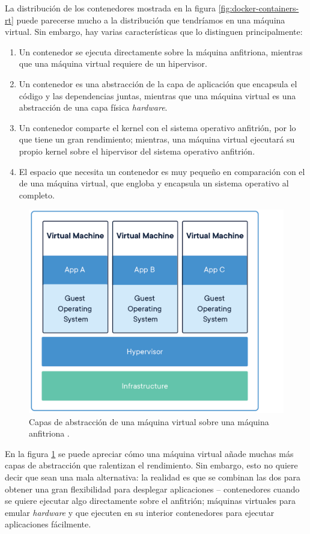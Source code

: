 La distribución de los contenedores mostrada en la figura \ref{fig:docker-containers-rt}
puede parecerse mucho a la distribución que tendríamos en una máquina virtual. Sin embargo,
hay varias características que lo distinguen principalmente:

\begin{enumerate}
    \item Un contenedor se ejecuta directamente sobre la máquina anfitriona, mientras
          que una máquina virtual requiere de un hipervisor.
    \item Un contenedor es una abstracción de la capa de aplicación que encapsula
          el código y las dependencias juntas, mientras que una máquina virtual es
          una abstracción de una capa física \textit{hardware}.
    \item Un contenedor comparte el kernel con el sistema operativo anfitrión, por lo
          que tiene un gran rendimiento; mientras, una máquina virtual ejecutará su
          propio kernel sobre el hipervisor del sistema operativo anfitrión.
    \item El espacio que necesita un contenedor es muy pequeño en comparación con el
          de una máquina virtual, que engloba y encapsula un sistema operativo al
          completo.
\end{enumerate}

\begin{figure}[H]
    \centering
    \includegraphics[width=.7\linewidth]{pictures/container-vm-whatcontainer_2.png}
    \caption{Capas de abstracción de una máquina virtual sobre una máquina anfitriona \cite{WhatContainerApp}.}
    \label{fig:vm-layers}
\end{figure}

En la figura \ref{fig:vm-layers} se puede apreciar cómo una máquina virtual añade
muchas más capas de abstracción que ralentizan el rendimiento. Sin embargo, esto
no quiere decir que sean una mala alternativa: la realidad es que se combinan las
dos para obtener una gran flexibilidad para desplegar aplicaciones -- contenedores
cuando se quiere ejecutar algo directamente sobre el anfitrión; máquinas virtuales
para emular \textit{hardware} y que ejecuten en su interior contenedores para ejecutar
aplicaciones fácilmente.

